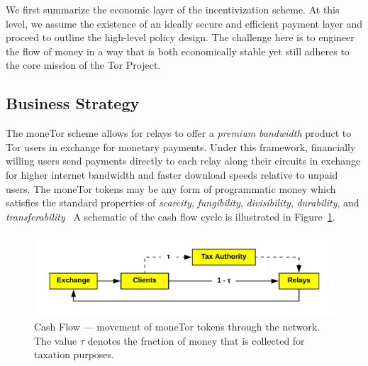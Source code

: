 
We first summarize the economic layer of the incentivization scheme. At this
level, we assume the existence of an ideally secure and efficient payment layer
and proceed to outline the high-level policy design. The challenge here is to
engineer the flow of money in a way that is both economically stable yet still
adheres to the core mission of the Tor Project.

\subsection{Business Strategy}

The moneTor scheme allows for relays to offer a \emph{premium bandwidth} product
to Tor users in exchange for monetary payments. Under this framework,
financially willing users send payments directly to each relay along their circuits
in exchange for higher internet bandwidth and faster download speeds relative to
unpaid users. %
The moneTor tokens %
may be any form of programmatic money which satisfies the standard properties of
\textit{scarcity}, \textit{fungibility}, \textit{divisibility},
\textit{durability}, and
\textit{transferability}~\cite[p.3]{crump2011phenomenon} A schematic of the cash
flow cycle is illustrated in Figure~\ref{fig:economic}.

\begin{figure}[h] \centering
  \includegraphics[trim={0.5cm, 0.5cm, 0.5cm, 0.5cm}, clip, scale=0.7]{images/economic_diagram.png}
  \caption[Cash Flow]{Cash Flow --- movement of moneTor tokens through the
    network. The value $\tau$ denotes the fraction of money that is collected
    for taxation purposes.}
  \label{fig:economic}
\end{figure}

